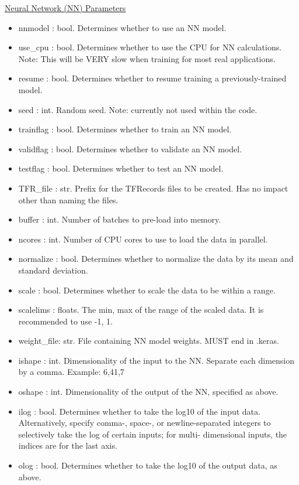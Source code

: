 \documentclass[letterpaper, 12pt]{article}
\begin{document}
\noindent \underline{Neural Network (NN) Parameters}
\begin{itemize}
\item nnmodel   : bool. Determines whether to use an NN model.
\item use\_cpu  : bool. Determines whether to use the CPU for NN calculations.  
                                    Note: This will be VERY slow when training for most real applications.  
\item resume     : bool. Determines whether to resume training a previously-trained 
                   model.
\item seed       : int.  Random seed.  Note: currently not used within the code.
\item trainflag  : bool. Determines whether to train    an NN model.
\item validflag  : bool. Determines whether to validate an NN model.
\item testflag   : bool. Determines whether to test     an NN model.

\item TFR\_file  : str.  Prefix for the TFRecords files to be created.
                                 Has no impact other than naming the files.
\item buffer     : int.  Number of batches to pre-load into memory.
\item ncores     : int.  Number of CPU cores to use to load the data in parallel.

\item normalize  : bool. Determines whether to normalize the data by its mean and 
                   standard deviation.
\item scale      : bool. Determines whether to scale the data to be within a range.
\item scalelims  : floats. The min, max of the range of the scaled data.
                     It is recommended to use -1, 1.

\item weight\_file: str.  File containing NN model weights.  MUST end in .keras.
\item ishape  : int.  Dimensionality of the input to the NN.  Separate each 
                      dimension by a comma.  Example: 6,41,7
\item oshape : int.  Dimensionality of the output of the NN, specified as above.
\item ilog        : bool. Determines whether to take the log10 of the input data.
                          Alternatively, specify comma-, space-, or newline-separated 
                          integers to selectively take the log of certain inputs; for multi-
                          dimensional inputs, the indices are for the last axis.
\item olog        : bool. Determines whether to take the log10 of the output data,
                          as above.


\end{itemize}
\end{document}
